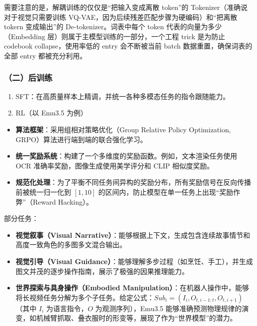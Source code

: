 需要注意的是，解耦训练的仅仅是``把输入变成离散 token''的 Tokenizer（准确说对于视觉只需要训练 VQ-VAE，因为后续残差匹配步骤为硬编码）和``把离散 tokern 变成输出''的 De-tokenizer。词表中每个 token 代表的向量为多少（Embedding 层）则属于主模型训练的一部分，一个工程 trick 是为防止 codebook collapse，使用率低的 entry 会不断被当前 batch 数据重置，确保词表的全部 entry 都被充分利用。

\hypertarget{ux4e8cux540eux8badux7ec3}{%
\subsubsection{（二）后训练}\label{ux4e8cux540eux8badux7ec3}}

\begin{enumerate}
\def\labelenumi{\arabic{enumi}.}
\item
  SFT：在高质量样本上精调，并统一各种多模态任务的指令跟随能力。
\item
  RL（以 Emu3.5 为例）
\end{enumerate}

\begin{itemize}
\tightlist
\item
  \textbf{算法框架}：采用组相对策略优化（Group Relative Policy Optimization, GRPO）算法进行端到端的联合强化学习。
\item
  \textbf{统一奖励系统}：构建了一个多维度的奖励函数。例如，文本渲染任务使用 OCR 准确率奖励，图像生成使用美学评分和 CLIP 相似度奖励。
\item
  \textbf{规范化处理}：为了平衡不同任务间异构的奖励分布，所有奖励信号在反向传播前被统一归一化到 \([1,10]\) 的区间内，防止模型在单一任务上出现``奖励作弊''（Reward Hacking）。
\end{itemize}

部分任务：

\begin{itemize}
\tightlist
\item
  \textbf{视觉叙事（Visual Narrative）}：能够根据上下文，生成包含连续故事情节和高度一致角色的多图多文混合输出。
\item
  \textbf{视觉引导（Visual Guidance）}：能够理解多步过程（如烹饪、手工），并生成图文并茂的逐步操作指南，展示了极强的因果推理能力。
\item
  \textbf{世界探索与具身操作（Embodied Manipulation）}：在机器人操作中，能够将长视频任务分解为多个子任务。给定公式：\(Sub_i=(I_i,O_{t,i-1:t},O_{t,i+1})\)（其中 \(I_i\) 为语言指令，\(O\) 为观测序列），Emu3.5 能够准确预测物理规律的演变，如机械臂抓取、叠衣服时的形变等，展现了作为``世界模型''的潜力。
\end{itemize}

